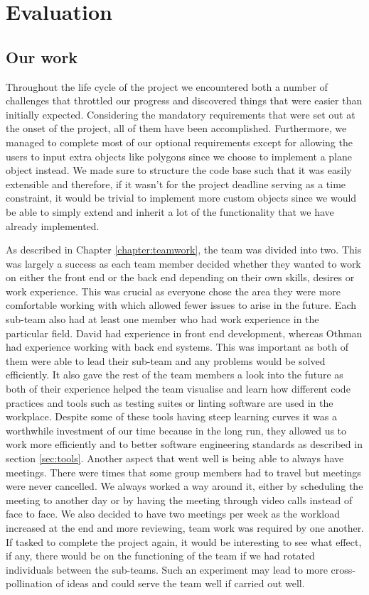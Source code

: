 \documentclass[a4paper]{report}
\begin{document}
	\chapter{Evaluation}
	\section{Our work}
	Throughout the life cycle of the project we encountered both a number of challenges that throttled our progress and discovered things that were easier than initially expected. Considering the mandatory requirements that were set out at the onset of the project, all of them have been accomplished. Furthermore, we managed to complete most of our optional requirements except for allowing the users to input extra objects like polygons since we choose to implement a plane object instead. We made sure to structure the code base such that it was easily extensible and therefore, if it wasn't for the project deadline serving as a time constraint, it would be trivial to implement more custom objects since we would be able to simply extend and inherit a lot of the functionality that we have already implemented. \newline
	
	\par As described in Chapter \ref{chapter:teamwork}, the team was divided into two. This was largely a success as each team member decided whether they wanted to work on either the front end or the back end depending on their own skills, desires or work experience. This was crucial as everyone chose the area they were more comfortable working with which allowed fewer issues to arise in the future. Each sub-team also had at least one member who had work experience in the particular field. David had experience in front end development, whereas Othman had experience working with back end systems. This was important as both of them were able to lead their sub-team and any problems would be solved efficiently. It also gave the rest of the team members a look into the future as both of their experience helped the team visualise and learn how different code practices and tools such as testing suites or linting software are used in the workplace. Despite some of these tools having steep learning curves it was a worthwhile investment of our time because in the long run, they allowed us to work more efficiently and to better software engineering standards as described in section \ref{sec:tools}. Another aspect that went well is being able to always have meetings. There were times that some group members had to travel but meetings were never cancelled. We always worked a way around it, either by scheduling the meeting to another day or by having the meeting through video calls instead of face to face. We also decided to have two meetings per week as the workload increased at the end and more reviewing, team work was required by one another. If tasked to complete the project again, it would be interesting to see what effect, if any, there would be on the functioning of the team if we had rotated individuals between the sub-teams. Such an experiment may lead to more cross-pollination of ideas and could serve the team well if carried out well. \newline 
	
\end{document}
